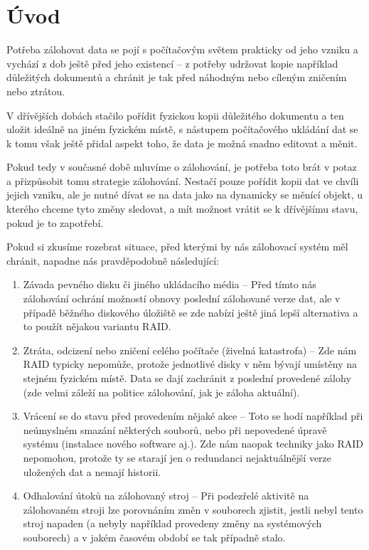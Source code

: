 \chapter*{Úvod}

Potřeba zálohovat data se pojí s počítačovým světem prakticky od jeho vzniku
a vychází z dob ještě před jeho existencí -- z potřeby udržovat kopie například
důležitých dokumentů a chránit je tak před náhodným nebo cíleným zničením nebo
ztrátou.

V dřívějších dobách stačilo pořídit fyzickou kopii důležitého dokumentu a ten
uložit ideálně na jiném fyzickém místě, s nástupem počítačového ukládání dat se
k tomu však ještě přidal aspekt toho, že data je možná snadno editovat a měnit.

Pokud tedy v současné době mluvíme o zálohování, je potřeba toto brát v potaz
a přizpůsobit tomu strategie zálohování. Nestačí pouze pořídit kopii dat ve
chvíli jejich vzniku, ale je nutné dívat se na data jako na dynamicky se měnící
objekt, u kterého chceme tyto změny sledovat, a mít možnost vrátit se
k dřívějšímu stavu, pokud je to zapotřebí.

Pokud si zkusíme rozebrat situace, před kterými by nás zálohovací systém měl
chránit, napadne nás pravděpodobně následující:


\begin{enumerate}
	\item Závada pevného disku či jiného ukládacího média -- Před tímto nás
	zálohování ochrání možností obnovy poslední zálohované verze dat, ale
	v případě běžného diskového úložiště se zde nabízí ještě jiná lepší
	alternativa a to použít nějakou variantu \gls{RAID}.
	\item Ztráta, odcizení nebo zničení celého počítače (živelná katastrofa)
	-- Zde nám \gls{RAID} typicky nepomůže, protože jednotlivé disky v něm
	bývají umístěny na stejném fyzickém místě. Data se dají zachránit
	z poslední provedené zálohy (zde velmi záleží na politice zálohování,
	jak je záloha aktuální).
	\item Vrácení se do stavu před provedením nějaké akce -- Toto se hodí
	například při neúmyslném smazání některých souborů, nebo při nepovedené
	úpravě systému (instalace nového software aj.). Zde nám naopak techniky
	jako \gls{RAID} nepomohou, protože ty se starají jen o redundanci
	nejaktuálnější verze uložených dat a nemají historii.
	\item Odhalování útoků na zálohovaný stroj -- Při podezřelé aktivitě na
	zálohovaném stroji lze porovnáním změn v souborech zjistit, jestli nebyl
	tento stroj napaden (a nebyly například provedeny změny na systémových
	souborech) a v jakém časovém období se tak případně stalo.
\end{enumerate}

